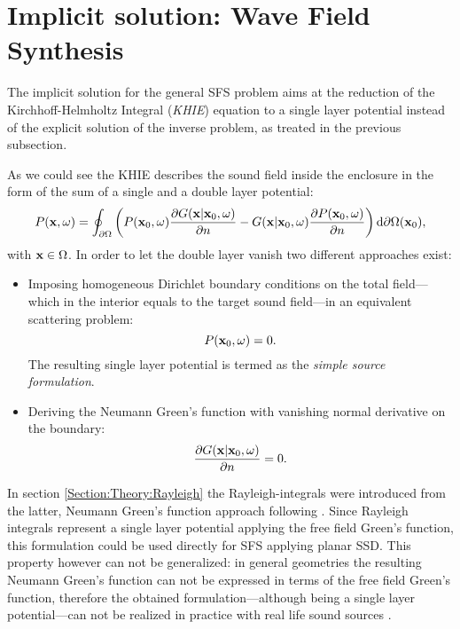 \section{Implicit solution: Wave Field Synthesis}

The implicit solution for the general SFS problem aims at the reduction of the Kirchhoff-Helmholtz Integral (\emph{KHIE}) equation to a single layer potential instead of the explicit solution of the inverse problem, as treated in the previous subsection. 

As we could see the KHIE describes the sound field inside the enclosure in the form of the sum of a single and a double layer potential:
\begin{equation}
P(\mathbf{x},\omega) = 
\oint_{\partial \Omega}  \left( 
P(\mathbf{x}_0,\omega)  \frac{\partial G(\mathbf{x}|\mathbf{x}_0,\omega)}{\partial n}  -  
G(\mathbf{x}|\mathbf{x}_0,\omega) \frac{\partial P(\mathbf{x}_0,\omega)}{\partial n} 
\right)   \mathrm{d} \partial \Omega ( \mathbf{x}_0),
\end{equation}
with $\mathbf{x} \in \Omega$.
In order to let the double layer vanish two different approaches exist:
\begin{itemize}
\item Imposing homogeneous Dirichlet boundary conditions on the total field---which in the interior equals to the target sound field---in an equivalent scattering problem: 
\begin{equation}
P(\mathbf{x}_0,\omega) = 0.
\end{equation}
The resulting single layer potential is termed as the \emph{simple source formulation}.
\item Deriving the Neumann Green's function with vanishing normal derivative on the boundary:
\begin{equation}
\frac{\partial G(\mathbf{x}|\mathbf{x}_0,\omega)}{\partial n}  = 0.
\end{equation}
\end{itemize}
In section \ref{Section:Theory:Rayleigh} the Rayleigh-integrals were introduced from the latter, Neumann Green's function approach following \cite{Berkhout1984}. Since Rayleigh integrals represent a single layer potential applying the free field Green's function, this formulation could be used directly for SFS applying planar SSD. 
This property however can not be generalized: in general geometries the resulting Neumann Green's function can not be expressed in terms of the free field Green's function, therefore the obtained formulation---although being a single layer potential---can not be realized in practice with real life sound sources \cite{Schultz2014:Comparing_approaches}.

